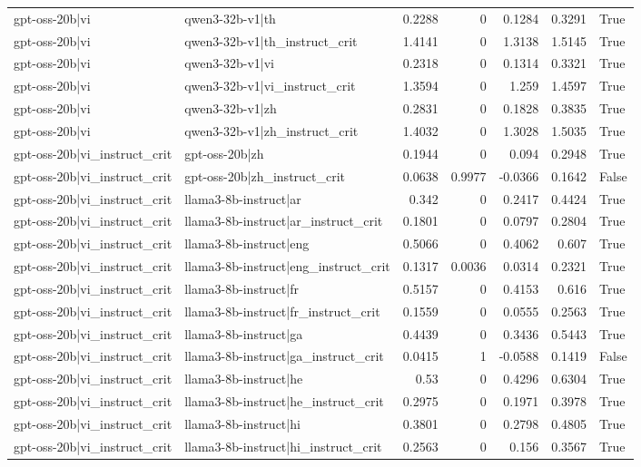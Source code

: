 \begin{table}
\begin{tabular}{l l r r r r l}
gpt-oss-20b|vi & qwen3-32b-v1|th & 0.2288 & 0 & 0.1284 & 0.3291 & True \\
gpt-oss-20b|vi & qwen3-32b-v1|th_instruct_crit & 1.4141 & 0 & 1.3138 & 1.5145 & True \\
gpt-oss-20b|vi & qwen3-32b-v1|vi & 0.2318 & 0 & 0.1314 & 0.3321 & True \\
gpt-oss-20b|vi & qwen3-32b-v1|vi_instruct_crit & 1.3594 & 0 & 1.259 & 1.4597 & True \\
gpt-oss-20b|vi & qwen3-32b-v1|zh & 0.2831 & 0 & 0.1828 & 0.3835 & True \\
gpt-oss-20b|vi & qwen3-32b-v1|zh_instruct_crit & 1.4032 & 0 & 1.3028 & 1.5035 & True \\
gpt-oss-20b|vi_instruct_crit & gpt-oss-20b|zh & 0.1944 & 0 & 0.094 & 0.2948 & True \\
gpt-oss-20b|vi_instruct_crit & gpt-oss-20b|zh_instruct_crit & 0.0638 & 0.9977 & -0.0366 & 0.1642 & False \\
gpt-oss-20b|vi_instruct_crit & llama3-8b-instruct|ar & 0.342 & 0 & 0.2417 & 0.4424 & True \\
gpt-oss-20b|vi_instruct_crit & llama3-8b-instruct|ar_instruct_crit & 0.1801 & 0 & 0.0797 & 0.2804 & True \\
gpt-oss-20b|vi_instruct_crit & llama3-8b-instruct|eng & 0.5066 & 0 & 0.4062 & 0.607 & True \\
gpt-oss-20b|vi_instruct_crit & llama3-8b-instruct|eng_instruct_crit & 0.1317 & 0.0036 & 0.0314 & 0.2321 & True \\
gpt-oss-20b|vi_instruct_crit & llama3-8b-instruct|fr & 0.5157 & 0 & 0.4153 & 0.616 & True \\
gpt-oss-20b|vi_instruct_crit & llama3-8b-instruct|fr_instruct_crit & 0.1559 & 0 & 0.0555 & 0.2563 & True \\
gpt-oss-20b|vi_instruct_crit & llama3-8b-instruct|ga & 0.4439 & 0 & 0.3436 & 0.5443 & True \\
gpt-oss-20b|vi_instruct_crit & llama3-8b-instruct|ga_instruct_crit & 0.0415 & 1 & -0.0588 & 0.1419 & False \\
gpt-oss-20b|vi_instruct_crit & llama3-8b-instruct|he & 0.53 & 0 & 0.4296 & 0.6304 & True \\
gpt-oss-20b|vi_instruct_crit & llama3-8b-instruct|he_instruct_crit & 0.2975 & 0 & 0.1971 & 0.3978 & True \\
gpt-oss-20b|vi_instruct_crit & llama3-8b-instruct|hi & 0.3801 & 0 & 0.2798 & 0.4805 & True \\
gpt-oss-20b|vi_instruct_crit & llama3-8b-instruct|hi_instruct_crit & 0.2563 & 0 & 0.156 & 0.3567 & True \\

\end{tabular}
\end{table}
